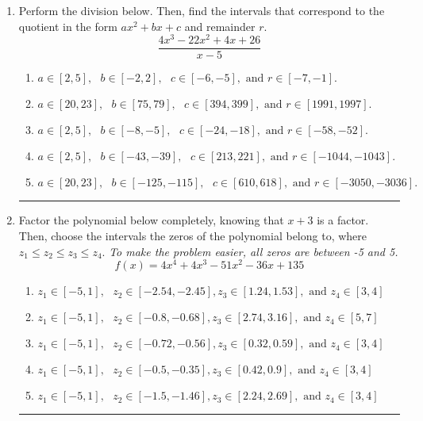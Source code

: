 \documentclass[14pt]{extbook}
\newcommand{\litem}[1]{\item#1\hspace*{-1cm}\rule{\textwidth}{0.4pt}}
\begin{document}
\begin{enumerate}
{\begin{enumerate}[label=\Alph*.]
\end{enumerate} }
\litem{
Perform the division below. Then, find the intervals that correspond to the quotient in the form $ax^2+bx+c$ and remainder $r$.\[ \frac{4x^{3} -22 x^{2} +4 x + 26}{x -5} \]\begin{enumerate}[label=\Alph*.]
\item \( a \in [2, 5], \text{   } b \in [-2, 2], \text{   } c \in [-6, -5], \text{   and   } r \in [-7, -1]. \)
\item \( a \in [20, 23], \text{   } b \in [75, 79], \text{   } c \in [394, 399], \text{   and   } r \in [1991, 1997]. \)
\item \( a \in [2, 5], \text{   } b \in [-8, -5], \text{   } c \in [-24, -18], \text{   and   } r \in [-58, -52]. \)
\item \( a \in [2, 5], \text{   } b \in [-43, -39], \text{   } c \in [213, 221], \text{   and   } r \in [-1044, -1043]. \)
\item \( a \in [20, 23], \text{   } b \in [-125, -115], \text{   } c \in [610, 618], \text{   and   } r \in [-3050, -3036]. \)

\end{enumerate} }
\litem{
Factor the polynomial below completely, knowing that $x + 3$ is a factor. Then, choose the intervals the zeros of the polynomial belong to, where $z_1 \leq z_2 \leq z_3 \leq z_4$. \textit{To make the problem easier, all zeros are between -5 and 5.}\[ f(x) = 4x^{4} +4 x^{3} -51 x^{2} -36 x + 135 \]\begin{enumerate}[label=\Alph*.]
\item \( z_1 \in [-5, 1], \text{   }  z_2 \in [-2.54, -2.45], z_3 \in [1.24, 1.53], \text{   and   } z_4 \in [3, 4] \)
\item \( z_1 \in [-5, 1], \text{   }  z_2 \in [-0.8, -0.68], z_3 \in [2.74, 3.16], \text{   and   } z_4 \in [5, 7] \)
\item \( z_1 \in [-5, 1], \text{   }  z_2 \in [-0.72, -0.56], z_3 \in [0.32, 0.59], \text{   and   } z_4 \in [3, 4] \)
\item \( z_1 \in [-5, 1], \text{   }  z_2 \in [-0.5, -0.35], z_3 \in [0.42, 0.9], \text{   and   } z_4 \in [3, 4] \)
\item \( z_1 \in [-5, 1], \text{   }  z_2 \in [-1.5, -1.46], z_3 \in [2.24, 2.69], \text{   and   } z_4 \in [3, 4] \)


\end{enumerate}}
\end{enumerate}
\end{document}
